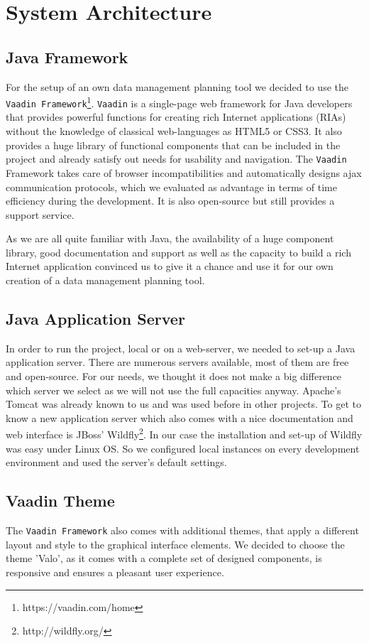 \section{System Architecture}
\subsection{Java Framework}
For the setup of an own data management planning tool we decided to use the \texttt{Vaadin Framework}\footnote{https://vaadin.com/home}. \texttt{Vaadin} is a single-page web framework for Java developers that provides powerful functions for creating rich Internet applications (RIAs) without the knowledge of classical web-languages as HTML5 or CSS3. It also provides a huge library of functional components that can be included in the project and already satisfy out needs for usability and navigation.
The \texttt{Vaadin} Framework takes care of browser incompatibilities and automatically designs ajax communication protocols, which we evaluated as advantage in terms of time efficiency during the development. It is also open-source but still provides a support service. 

As we are all quite familiar with Java, the availability of a huge component library, good documentation and support as well as the capacity to build a rich Internet application convinced us to give it a chance and use it for our own creation of a data management planning tool.

\subsection{Java Application Server}
In order to run the project, local or on a web-server, we needed to set-up a Java application server. There are numerous servers available, most of them are free and open-source. For our needs, we thought it does not make a big difference which server we select as we will not use the full capacities anyway. 
Apache's Tomcat was already known to us and was used before in other projects. To get to know a new application server which also comes with a nice documentation and web interface is JBoss' Wildfly\footnote{http://wildfly.org/}. 
In our case the installation and set-up of Wildfly was easy under Linux OS. So we configured local instances on every development environment and used the server's default settings.

\subsection{Vaadin Theme}
The \texttt{Vaadin Framework} also comes with additional themes, that apply a different layout and style to the graphical interface elements. We decided to choose the theme 'Valo', as it comes with a complete set of designed components, is responsive and ensures a pleasant user experience.